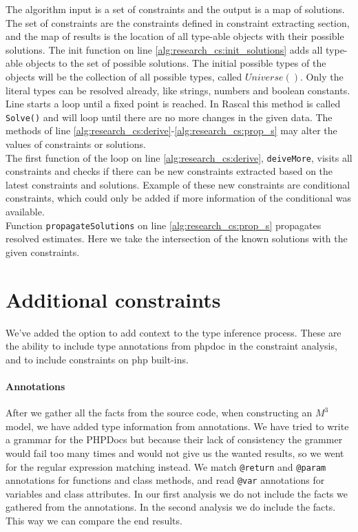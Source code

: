 \documentclass[../main.tex]{subfiles}
\begin{document}
    
    The algorithm input is a set of constraints and the output is a map of solutions.
    The set of constraints are the constraints defined in constraint extracting section, and the map of results is the location of all type-able objects with their possible solutions.
    The init function on line \ref{alg:research_cs:init_solutions} adds all type-able objects to the set of possible solutions.
    The initial possible types of the objects will be the collection of all possible types, called $Universe()$.
    Only the literal types can be resolved already, like strings, numbers and boolean constants.
    \\
    Line \label{alg:research_cs:loop_start} starts a loop until a fixed point is reached. 
    In Rascal this method is called \texttt{Solve()} and will loop until there are no more changes in the given data.
    The methods of line \ref{alg:research_cs:derive}-\ref{alg:research_cs:prop_s} may alter the values of constraints or solutions.
    \\
    The first function of the loop on line \ref{alg:research_cs:derive}, \texttt{deiveMore}, visits all constraints and checks if there can be new constraints extracted based on the latest constraints and solutions.
    Example of these new constraints are conditional constraints, which could only be added if more information of the conditional was available.
    \\
    Function \texttt{propagateSolutions} on line \ref{alg:research_cs:prop_s} propagates resolved estimates. 
    Here we take the intersection of the known solutions with the given constraints.
        
        
    \section{Additional constraints}\label{sec:implementation_additional_contraints}
    We've added the option to add context to the type inference process.
    These are the ability to include type annotations from phpdoc in the constraint analysis, and to include constraints on php built-ins.
    
    \paragraph{Annotations}
    After we gather all the facts from the source code, when constructing an $M^3$ model, we have added type information from annotations.
    We have tried to write a grammar for the PHPDocs but because their lack of consistency the grammer would fail too many times and would not give us the wanted results, so we went for the regular expression matching instead.
    We match \texttt{@return} and \texttt{@param} annotations for functions and class methods, and read \texttt{@var} annotations for variables and class attributes.
    In our first analysis we do not include the facts we gathered from the annotations. 
    In the second analysis we do include the facts.
    This way we can compare the end results.
    
\end{document}
